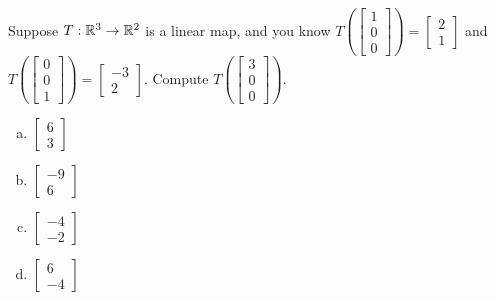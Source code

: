 \begin{activity}{5}
Suppose \(T: \mathbb{R}^3 \rightarrow \mathbb{R}^2\) is a linear map, and you know
\(
  T\left(\begin{bmatrix} 1 \\ 0 \\ 0 \end{bmatrix} \right)
=
  \begin{bmatrix} 2 \\ 1 \end{bmatrix}
\)
and
\(
  T\left(\begin{bmatrix} 0 \\ 0 \\ 1 \end{bmatrix} \right)
=
  \begin{bmatrix} -3 \\ 2 \end{bmatrix}
\).
Compute \(T\left(\begin{bmatrix} 3 \\ 0 \\ 0 \end{bmatrix}\right)\).
\begin{multicols}{2}
\begin{enumerate}[(a)]
\item \(\begin{bmatrix} 6 \\ 3\end{bmatrix}\)
\item \(\begin{bmatrix} -9 \\ 6 \end{bmatrix}\)
\item \(\begin{bmatrix} -4 \\ -2 \end{bmatrix}\)
\item \(\begin{bmatrix} 6 \\ -4 \end{bmatrix}\)
\end{enumerate}
\end{multicols}
\end{activity}

